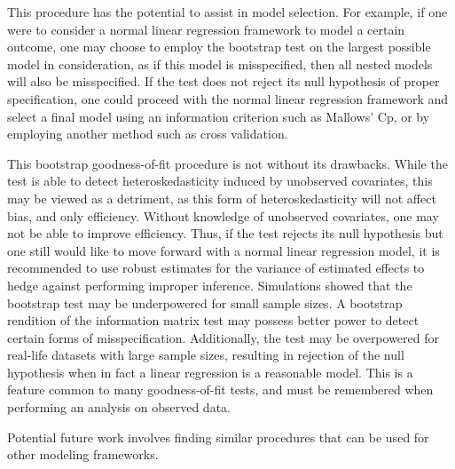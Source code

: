 \documentclass[review]{elsarticle}
\begin{document}
This procedure has the potential to assist in model selection. For example, if one were to consider a normal linear regression framework to model a certain outcome, one may
choose to employ the bootstrap test on the largest possible model in consideration, as if this model is misspecified, then all nested models will also be misspecified.
If the test does not reject its null hypothesis of proper specification, one could proceed with the normal linear regression framework and select a final model using
an information criterion such as Mallows' Cp, or by employing another method such as cross validation.

This bootstrap goodness-of-fit procedure is not without its drawbacks. While the test is able to detect heteroskedasticity induced by unobserved covariates, this may be viewed as a detriment,
as this form of heteroskedasticity will not affect bias, and only efficiency. Without knowledge of unobserved covariates, one may not be able to improve efficiency. Thus, if the test rejects its
null hypothesis but one still would like  to move forward with a normal linear regression model, it is recommended to use robust estimates for the variance of estimated effects
to hedge against performing improper inference. Simulations showed that the bootstrap test may be underpowered for small sample sizes. A bootstrap rendition of the information matrix test may
possess better power to detect certain forms of misspecification. Additionally, the test may be overpowered for real-life datasets with large sample sizes, resulting in rejection of the null hypothesis
when in fact a linear regression is a reasonable model. This is a feature common to many goodness-of-fit tests, and must be remembered when performing an analysis on observed data.

Potential future work involves finding similar procedures that can be used for other modeling frameworks.

\end{document}
